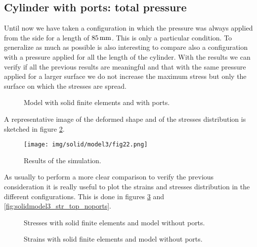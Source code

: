 \documentclass[a4paper,12pt]{article}
\begin{document}
\subsection{Cylinder with ports: total pressure}

Until now we have taken a configuration in which the pressure was always applied from the side for a length of $85\,\text{mm}$. This is only a particular condition. To generalize as much as possible is also interesting to compare also a configuration with a pressure applied for all the length of the cylinder. With the results we can verify if all the previous results are meaningful and that with the same pressure applied for a larger surface we do not increase the maximum stress but only the surface on which the stresses are spread.

\begin{figure}[H]
\centering     %
\caption{Model with solid finite elements and with ports.}
\label{fig:solidmodel3_abqconfig}
\end{figure}

A representative image of the deformed shape and of the stresses distribution is sketched in figure \ref{fig:solidmodel3_abqstresses}.

\begin{figure}[h]
\centering
\texttt{[image: img/solid/model3/fig22.png]}
\caption{Results of the simulation.}
\label{fig:solidmodel3_abqstresses}
\end{figure}

As usually to perform a more clear comparison to verify the previous consideration it is really useful to plot the strains and stresses distribution in the different configurations. This is done in figures \ref{fig:solidmodel3_stress_top_noports} and \ref{fig:solidmodel3_str_top_noports}.

\begin{figure}[H]
\centering     %
\caption{Stresses with solid finite elements and model without ports.}
\label{fig:solidmodel3_stress_top_noports}
\end{figure}

\begin{figure}[H]
\centering     %
\caption{Strains with solid finite elements and model without ports.}
\label{fig:solidmodel3_strain_top_noports}
\end{figure}
\end{document}
